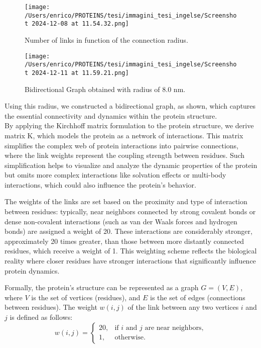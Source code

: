 \documentclass[English, Lau, oneside]{sapthesis}
\begin{document}
\begin{figure}[h!]
    \centering
    \texttt{[image: /Users/enrico/PROTEINS/tesi/immagini\_tesi\_ingelse/Screenshot 2024-12-08 at 11.54.32.png]}
    \caption{Number of links in function of the connection radius.}
\end{figure}

\begin{figure}[h!]
    \centering
    \texttt{[image: /Users/enrico/PROTEINS/tesi/immagini\_tesi\_ingelse/Screenshot 2024-12-11 at 11.59.21.png]}
    \label{fig:grafo_connessione}
    \caption{Bidirectional Graph obtained with radius of 8.0 nm.}
\end{figure}
Using this radius, we constructed a bidirectional graph, as shown, which captures the essential connectivity and dynamics within the protein structure.\\


By applying the Kirchhoff matrix formulation to the protein structure, we derive matrix K, which models the protein as a network of interactions. This matrix simplifies the complex web of protein interactions into pairwise connections, where the link weights represent the coupling strength between residues. Such simplification helps to visualize and analyze the dynamic properties of the protein but omits more complex interactions like solvation effects or multi-body interactions, which could also influence the protein's behavior.

The weights of the links are set based on the proximity and type of interaction between residues: typically, near neighbors connected by strong covalent bonds or dense non-covalent interactions (such as van der Waals forces and hydrogen bonds) are assigned a weight of 20. These interactions are considerably stronger, approximately 20 times greater, than those between more distantly connected residues, which receive a weight of 1. This weighting scheme reflects the biological reality where closer residues have stronger interactions that significantly influence protein dynamics.

Formally, the protein’s structure can be represented as a graph \( G = (V, E) \), where \( V \) is the set of vertices (residues), and \( E \) is the set of edges (connections between residues). The weight \( w(i, j) \) of the link between any two vertices \( i \) and \( j \) is defined as follows:
\[
w(i, j) =
\begin{cases}
20, & \text{if } i \text{ and } j \text{ are near neighbors}, \\
1, & \text{otherwise}.
\end{cases}
\]
\end{document}
